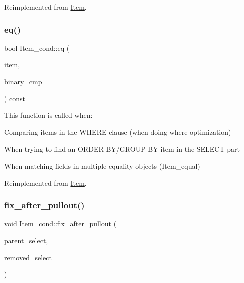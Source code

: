 Reimplemented from \mbox{\hyperlink{classItem}{Item}}.

\mbox{\label{classItem__cond_aa73fc3b0f22689cebea9205dbf275421}} 
\subsubsection{\texorpdfstring{eq()}{eq()}}
{\footnotesize\ttfamily bool Item\+\_\+cond\+::eq (\begin{DoxyParamCaption}\item[{const \mbox{\hyperlink{classItem}{Item}} $\ast$}]{item,  }\item[{bool}]{binary\+\_\+cmp }\end{DoxyParamCaption}) const\hspace{0.3cm}{\ttfamily [virtual]}}

This function is called when\+:
\begin{DoxyItemize}
\item Comparing items in the W\+H\+E\+RE clause (when doing where optimization)
\item When trying to find an O\+R\+D\+ER B\+Y/\+G\+R\+O\+UP BY item in the S\+E\+L\+E\+CT part
\item When matching fields in multiple equality objects (Item\+\_\+equal) 
\end{DoxyItemize}

Reimplemented from \mbox{\hyperlink{classItem_af0957bbdb9a256de0cd29f1adcae28be}{Item}}.

\mbox{\label{classItem__cond_a8bef49149dce6339066280ef3a43f666}} 
\subsubsection{\texorpdfstring{fix\+\_\+after\+\_\+pullout()}{fix\_after\_pullout()}}
{\footnotesize\ttfamily void Item\+\_\+cond\+::fix\+\_\+after\+\_\+pullout (\begin{DoxyParamCaption}\item[{st\+\_\+select\+\_\+lex $\ast$}]{parent\+\_\+select,  }\item[{st\+\_\+select\+\_\+lex $\ast$}]{removed\+\_\+select }\end{DoxyParamCaption})\hspace{0.3cm}{\ttfamily [virtual]}}

